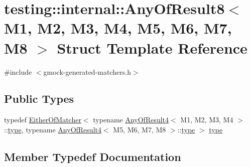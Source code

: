 \hypertarget{structtesting_1_1internal_1_1_any_of_result8}{}\section{testing\+:\+:internal\+:\+:Any\+Of\+Result8$<$ M1, M2, M3, M4, M5, M6, M7, M8 $>$ Struct Template Reference}
\label{structtesting_1_1internal_1_1_any_of_result8}


{\ttfamily \#include $<$gmock-\/generated-\/matchers.\+h$>$}

\subsection*{Public Types}
\begin{DoxyCompactItemize}
\item 
typedef \hyperlink{classtesting_1_1internal_1_1_either_of_matcher}{Either\+Of\+Matcher}$<$ typename \hyperlink{structtesting_1_1internal_1_1_any_of_result4}{Any\+Of\+Result4}$<$ M1, M2, M3, M4 $>$\+::\hyperlink{structtesting_1_1internal_1_1_any_of_result8_a8f8a1e78a019965c24bd22c78885747d}{type}, typename \hyperlink{structtesting_1_1internal_1_1_any_of_result4}{Any\+Of\+Result4}$<$ M5, M6, M7, M8 $>$\+::\hyperlink{structtesting_1_1internal_1_1_any_of_result8_a8f8a1e78a019965c24bd22c78885747d}{type} $>$ \hyperlink{structtesting_1_1internal_1_1_any_of_result8_a8f8a1e78a019965c24bd22c78885747d}{type}
\end{DoxyCompactItemize}


\subsection{Member Typedef Documentation}
\mbox{\label{structtesting_1_1internal_1_1_any_of_result8_a8f8a1e78a019965c24bd22c78885747d}} 

